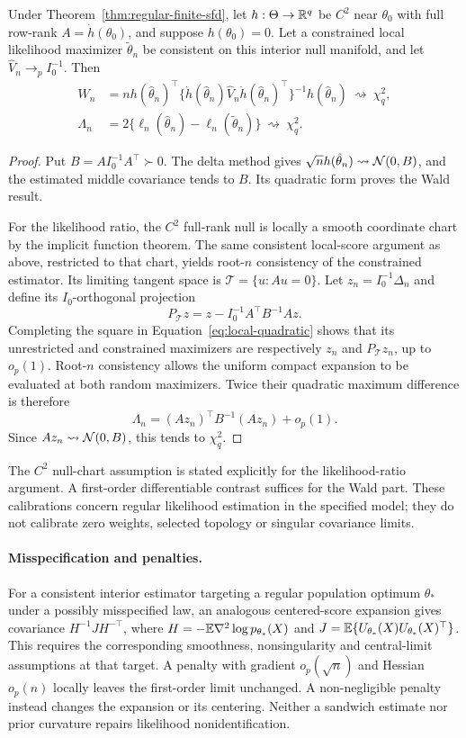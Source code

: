 \begin{proposition}
\label{prop:regular-tests}
Under Theorem~\ref{thm:regular-finite-sfd}, let
$h:\Theta\to\mathbb R^q$ be $C^2$ near $\theta_0$ with full row-rank
$A=\dot h(\theta_0)$, and suppose $h(\theta_0)=0$. Let a constrained
local likelihood maximizer $\tilde\theta_n$ be consistent on this interior
null manifold, and let $\hat V_n\to_p I_0^{-1}$. Then
\begin{align*}
 W_n&=n h(\hat\theta_n)^\top
  \{\dot h(\hat\theta_n)\hat V_n\dot h(\hat\theta_n)^\top\}^{-1}
   h(\hat\theta_n)\ \rightsquigarrow\ \chi_q^2,\\
 \Lambda_n&=2\{\ell_n(\hat\theta_n)-\ell_n(\tilde\theta_n)\}
                  \ \rightsquigarrow\ \chi_q^2.
\end{align*}
\end{proposition}
\begin{proof}
Put $B=AI_0^{-1}A^\top\succ0$. The delta method gives
$\sqrt n h(\hat\theta_n)\rightsquigarrow\mathcal N(0,B)$, and the estimated
middle covariance tends to $B$. Its quadratic form proves the Wald result.

For the likelihood ratio, the $C^2$ full-rank null is locally a smooth
coordinate chart by the implicit function theorem. The same consistent
local-score argument as above, restricted to that chart, yields root-$n$
consistency of the constrained estimator. Its limiting tangent space is
$\mathcal T=\{u:Au=0\}$. Let $z_n=I_0^{-1}\Delta_n$ and define its
$I_0$-orthogonal projection
\[
 P_{\mathcal T}z=z-I_0^{-1}A^\top B^{-1}Az.
\]
Completing the square in Equation~\ref{eq:local-quadratic} shows that its
unrestricted and constrained maximizers are respectively $z_n$ and
$P_{\mathcal T}z_n$, up to $o_p(1)$. Root-$n$ consistency allows the
uniform compact expansion to be evaluated at both random maximizers.
Twice their quadratic maximum difference is therefore
\[
 \Lambda_n=(Az_n)^\top B^{-1}(Az_n)+o_p(1).
\]
Since $Az_n\rightsquigarrow\mathcal N(0,B)$, this tends to $\chi_q^2$.
\end{proof}

The $C^2$ null-chart assumption is stated explicitly for the likelihood-ratio
argument. A first-order differentiable contrast suffices for the Wald part.
These calibrations concern regular likelihood estimation in the specified
model; they do not calibrate zero weights, selected topology or singular
covariance limits.

\paragraph{Misspecification and penalties.}
For a consistent interior estimator targeting a regular population optimum
$\theta_*$ under a possibly misspecified law, an analogous centered-score
expansion gives covariance $H^{-1}JH^{-\top}$, where
$H=-\mathbb E\nabla^2\log p_{\theta_*}(X)$ and
$J=\mathbb E\{U_{\theta_*}(X)U_{\theta_*}(X)^\top\}$. This requires the
corresponding smoothness, nonsingularity and central-limit assumptions at
that target. A penalty with gradient $o_p(\sqrt n)$ and Hessian $o_p(n)$
locally leaves the first-order limit unchanged. A non-negligible penalty
instead changes the expansion or its centering. Neither a sandwich estimate
nor prior curvature repairs likelihood nonidentification.
